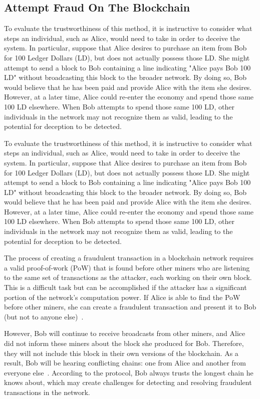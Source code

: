 \subsection{Attempt Fraud On The Blockchain}
To evaluate the trustworthiness of this method, it is instructive to consider what steps an individual, such as Alice, would need to take
in order to deceive the system. In particular, suppose that Alice desires to purchase an item from Bob for 100 Ledger Dollars (LD), but
does not actually possess those LD. She might attempt to send a block to Bob containing a line indicating "Alice pays Bob 100 LD"
without broadcasting this block to the broader network. By doing so, Bob would believe that he has been paid and provide Alice with the
item she desires. However, at a later time, Alice could re-enter the economy and spend those same 100 LD elsewhere. When Bob attempts to
spend those same 100 LD, other individuals in the network may not recognize them as valid, leading to the potential for deception to be
detected.

To evaluate the trustworthiness of this method, it is instructive to consider what steps an individual, such as Alice, would need to take
in order to deceive the system. In particular, suppose that Alice desires to purchase an item from Bob for 100 Ledger Dollars (LD), but
does not actually possess those LD. She might attempt to send a block to Bob containing a line indicating "Alice pays Bob 100 LD"
without broadcasting this block to the broader network. By doing so, Bob would believe that he has been paid and provide Alice with the
item she desires. However, at a later time, Alice could re-enter the economy and spend those same 100 LD elsewhere. When Bob attempts to
spend those same 100 LD, other individuals in the network may not recognize them as valid, leading to the potential for deception to be
detected.

The process of creating a fraudulent transaction in a blockchain network requires a valid proof-of-work (PoW) that is found before other
miners who are listening to the same set of transactions as the attacker, each working on their own block. This is a difficult task but
can be accomplished if the attacker has a significant portion of the network's computation power. If Alice is able to find the PoW before
other miners, she can create a fraudulent transaction and present it to Bob (but not to anyone else)~\cite{fang2022cryptocurrency}.

However, Bob will continue to receive broadcasts from other miners, and Alice did not inform these miners about the block she produced for
Bob. Therefore, they will not include this block in their own versions of the blockchain. As a result, Bob will be hearing conflicting
chains: one from Alice and another from everyone else~\cite{TAN2022101625}. According to the protocol, Bob always trusts the longest
chain he knows about, which may create challenges for detecting and resolving fraudulent transactions in the network.

